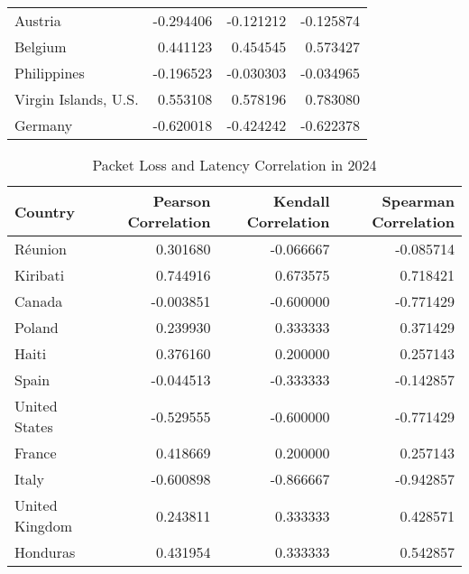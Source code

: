 \begin{table}
\begin{tabular}{lrrr}
		Austria                     & -0.294406           & -0.121212           & -0.125874            \\
		Belgium                     & 0.441123            & 0.454545            & 0.573427             \\
		Philippines                 & -0.196523           & -0.030303           & -0.034965            \\
		Virgin Islands, U.S.        & 0.553108            & 0.578196            & 0.783080             \\
		Germany                     & -0.620018           & -0.424242           & -0.622378            \\
		\bottomrule
	\end{tabular}
\end{table}


\begin{table}
	\caption{Packet Loss and Latency Correlation in 2024}
	\label{fig:packetloss-latency-correlation-2024}
	\begin{tabular}{lrrr}
		\toprule
		Country              & Pearson Correlation & Kendall Correlation & Spearman Correlation \\
		\midrule
		Réunion              & 0.301680            & -0.066667           & -0.085714            \\
		Kiribati             & 0.744916            & 0.673575            & 0.718421             \\
		Canada               & -0.003851           & -0.600000           & -0.771429            \\
		Poland               & 0.239930            & 0.333333            & 0.371429             \\
		Haiti                & 0.376160            & 0.200000            & 0.257143             \\
		Spain                & -0.044513           & -0.333333           & -0.142857            \\
		United States        & -0.529555           & -0.600000           & -0.771429            \\
		France               & 0.418669            & 0.200000            & 0.257143             \\
		Italy                & -0.600898           & -0.866667           & -0.942857            \\
		United Kingdom       & 0.243811            & 0.333333            & 0.428571             \\
		Honduras             & 0.431954            & 0.333333            & 0.542857             \\

\end{tabular}
\end{table}
